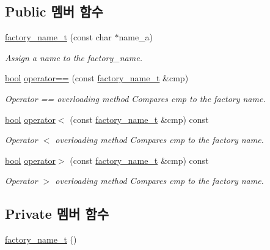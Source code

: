 \subsection*{Public 멤버 함수}
\begin{DoxyCompactItemize}
\item 
\hyperlink{classfactory__name__t_a888fb7d10206034bcbcb69918e02dd15}{factory\+\_\+name\+\_\+t} (const char $\ast$name\+\_\+a)
\begin{DoxyCompactList}\small\item\em Assign a name to the factory\+\_\+name. \end{DoxyCompactList}\item 
\hyperlink{avb__gptp_8h_af6a258d8f3ee5206d682d799316314b1}{bool} \hyperlink{classfactory__name__t_a60ea3491cfd05727035391ba27d21f7d}{operator==} (const \hyperlink{classfactory__name__t}{factory\+\_\+name\+\_\+t} \&cmp)
\begin{DoxyCompactList}\small\item\em Operator \textquotesingle{}==\textquotesingle{} overloading method Compares cmp to the factory name. \end{DoxyCompactList}\item 
\hyperlink{avb__gptp_8h_af6a258d8f3ee5206d682d799316314b1}{bool} \hyperlink{classfactory__name__t_aaeb47e140caef298cfff07c0880bad90}{operator$<$} (const \hyperlink{classfactory__name__t}{factory\+\_\+name\+\_\+t} \&cmp) const 
\begin{DoxyCompactList}\small\item\em Operator \textquotesingle{}$<$\textquotesingle{} overloading method Compares cmp to the factory name. \end{DoxyCompactList}\item 
\hyperlink{avb__gptp_8h_af6a258d8f3ee5206d682d799316314b1}{bool} \hyperlink{classfactory__name__t_a0a123a7e26787b979832128667914d79}{operator$>$} (const \hyperlink{classfactory__name__t}{factory\+\_\+name\+\_\+t} \&cmp) const 
\begin{DoxyCompactList}\small\item\em Operator \textquotesingle{}$>$\textquotesingle{} overloading method Compares cmp to the factory name. \end{DoxyCompactList}\end{DoxyCompactItemize}
\subsection*{Private 멤버 함수}
\begin{DoxyCompactItemize}
\item 
\hyperlink{classfactory__name__t_a1b81bdcd2683f471b6fca5b844f0acde}{factory\+\_\+name\+\_\+t} ()
\end{DoxyCompactItemize}
